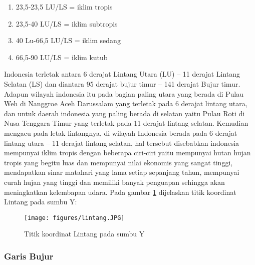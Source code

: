 \begin{enumerate}
\item 23,5-23,5 LU/LS = iklim tropis
\item 23,5-40 LU/LS = iklim subtropis
\item 40 Lu-66,5 LU/LS = iklim sedang
\item 66,5-90 LU/LS = iklim kutub
\end{enumerate}
Indonesia terletak antara 6 derajat Lintang Utara (LU) – 11 derajat Lintang Selatan (LS) dan diantara 95 derajat bujur timur – 141 derajat Bujur timur.
Adapun wilayah indonesia itu pada bagian paling utara yang berada di Pulau Weh di Nanggroe Aceh Darussalam yang terletak pada 6 derajat lintang utara, dan untuk daerah indonesia yang paling berada di selatan yaitu Pulau Roti di Nusa Tenggara Timur yang terletak pada 11 derajat lintang selatan. Kemudian mengacu pada letak lintangnya, di wilayah Indonesia berada pada 6 derajat lintang utara – 11 derajat lintang selatan, hal tersebut disebabkan indonesia mempunyai iklim tropis dengan beberapa ciri-ciri yaitu mempunyai hutan hujan tropis yang begitu luas dan mempunyai nilai ekonomis yang sangat tinggi, mendapatkan sinar matahari yang lama setiap sepanjang tahun, mempunyai curah hujan yang tinggi dan memiliki banyak penguapan sehingga akan meningkatkan kelembapan udara.
Pada gambar \ref{lintang} dijelaskan titik koordinat Lintang pada sumbu Y:
\begin{figure}[ht]

	\centerline{\texttt{[image: figures/lintang.JPG]}}
	\caption{Titik koordinat Lintang pada sumbu Y}

	\label{lintang}
	\end{figure}

\subsubsection{Garis Bujur}

